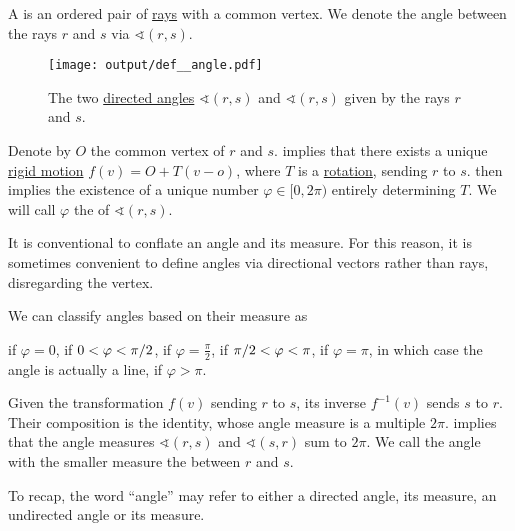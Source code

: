 \begin{definition}\label{def:angle}
  A  is an ordered pair of \hyperref[def:geometric_ray]{rays} with a common vertex. We denote the angle between the rays \( r \) and \( s \) via \( \sphericalangle(r, s) \).

  \begin{figure}[!ht]
    \centering
    \texttt{[image: output/def\_\_angle.pdf]}
    \caption{The two \hyperref[def:angle]{directed angles} \( \sphericalangle(r, s) \) and \( \sphericalangle(r, s) \) given by the rays \( r \) and \( s \).}\label{def:angle/measure/figure}
  \end{figure}

  \begin{thmenum}
     Denote by \( O \) the common vertex of \( r \) and \( s \).  implies that there exists a unique \hyperref[def:rigid_motion]{rigid motion} \( f(v) = O + T(v - o) \), where \( T \) is a \hyperref[def:rigid_motion/rotation]{rotation}, sending \( r \) to \( s \).  then implies the existence of a unique number \( \varphi \in [0, 2\pi) \) entirely determining \( T \). We will call \( \varphi \) the  of \( \sphericalangle(r, s) \).

    It is conventional to conflate an angle and its measure. For this reason, it is sometimes convenient to define angles via directional vectors rather than rays, disregarding the vertex.

    We can classify angles based on their measure as
    \begin{thmenum}
        if \( \varphi = 0 \),
        if \( 0 < \varphi < \ifrac \pi 2 \),
        if \( \varphi = \tfrac \pi 2 \),
        if \( \ifrac \pi 2 < \varphi < \pi \),
        if \( \varphi = \pi \), in which case the angle is actually a line,
        if \( \varphi > \pi \).
    \end{thmenum}

     Given the transformation \( f(v) \) sending \( r \) to \( s \), its inverse \( f^{-1}(v) \) sends \( s \) to \( r \). Their composition is the identity, whose angle measure is a multiple \( 2\pi \).  implies that the angle measures \( \sphericalangle(r, s) \) and \( \sphericalangle(s, r) \) sum to \( 2\pi \). We call the angle with the smaller measure the  between \( r \) and \( s \).

    To recap, the word \enquote{angle} may refer to either a directed angle, its measure, an undirected angle or its measure.
  \end{thmenum}
\end{definition}

